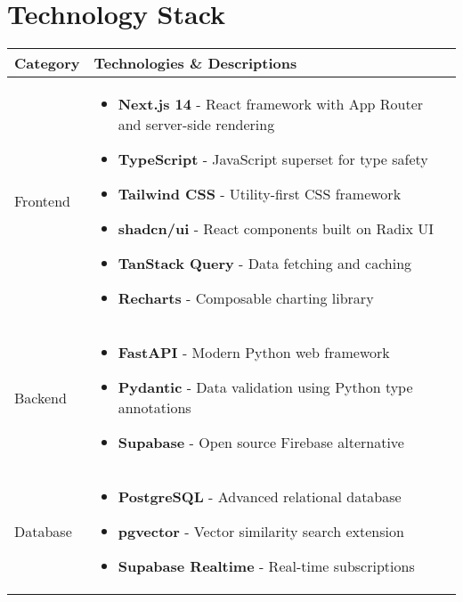 \section{Technology Stack}

\begingroup
\small
\setlength{\parskip}{0pt}
\setlength{\itemsep}{0pt}

\begin{table}[H]
\begin{tabularx}{\textwidth}{|>{\raggedright\arraybackslash}p{4.5cm}|X|}
\hline
\textbf{Category} & \textbf{Technologies \& Descriptions} \\
\hline
Frontend & 
\begin{itemize}[nosep,leftmargin=*,after=\vspace{-\baselineskip}]
    \item \textbf{Next.js 14} - React framework with App Router and server-side rendering
    \item \textbf{TypeScript} - JavaScript superset for type safety
    \item \textbf{Tailwind CSS} - Utility-first CSS framework
    \item \textbf{shadcn/ui} - React components built on Radix UI
    \item \textbf{TanStack Query} - Data fetching and caching
    \item \textbf{Recharts} - Composable charting library
\end{itemize} \\
\hline
Backend & 
\begin{itemize}[nosep,leftmargin=*,after=\vspace{-\baselineskip}]
    \item \textbf{FastAPI} - Modern Python web framework
    \item \textbf{Pydantic} - Data validation using Python type annotations
    \item \textbf{Supabase} - Open source Firebase alternative
\end{itemize} \\
\hline
Database & 
\begin{itemize}[nosep,leftmargin=*,after=\vspace{-\baselineskip}]
    \item \textbf{PostgreSQL} - Advanced relational database
    \item \textbf{pgvector} - Vector similarity search extension
    \item \textbf{Supabase Realtime} - Real-time subscriptions
\end{itemize} \\

\end{tabularx}
\end{table}
